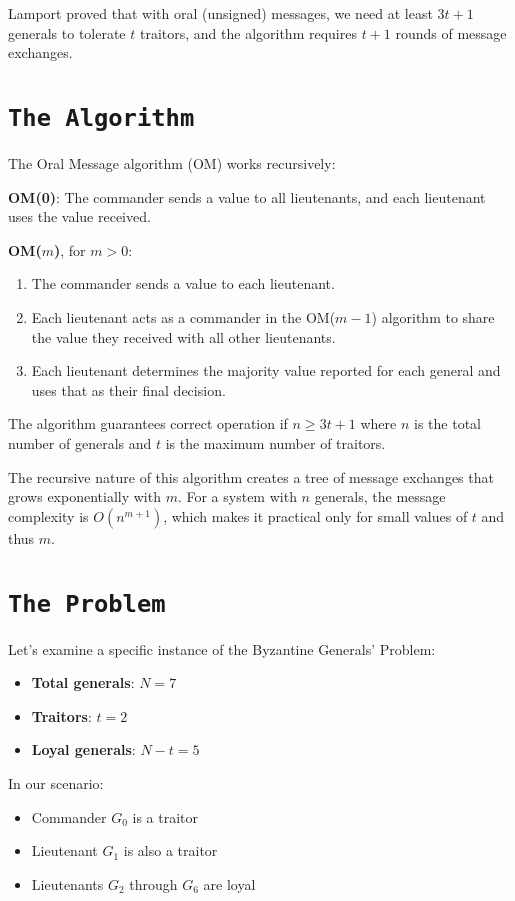 \documentclass[11pt]{article}
\begin{document}
Lamport proved that with oral (unsigned) messages, we need at least $3t+1$ generals to tolerate $t$ traitors, and the algorithm requires $t+1$ rounds of message exchanges.

\section*{\texttt{\Large The Algorithm}}
The Oral Message algorithm (OM) works recursively:

\textbf{OM(0)}: The commander sends a value to all lieutenants, and each lieutenant uses the value received.

\textbf{OM($m$)}, for $m > 0$:
\begin{enumerate}
    \item The commander sends a value to each lieutenant.
    \item Each lieutenant acts as a commander in the OM($m-1$) algorithm to share the value they received with all other lieutenants.
    \item Each lieutenant determines the majority value reported for each general and uses that as their final decision.
\end{enumerate}

The algorithm guarantees correct operation if $n \geq 3t+1$ where $n$ is the total number of generals and $t$ is the maximum number of traitors.

The recursive nature of this algorithm creates a tree of message exchanges that grows exponentially with $m$. For a system with $n$ generals, the message complexity is $O(n^{m+1})$, which makes it practical only for small values of $t$ and thus $m$.

\section*{\texttt{\Large The Problem}}
Let's examine a specific instance of the Byzantine Generals' Problem:

\begin{itemize}
    \item \textbf{Total generals}: $N = 7$
    \item \textbf{Traitors}: $t = 2$
    \item \textbf{Loyal generals}: $N - t = 5$
\end{itemize}

In our scenario:
\begin{itemize}
    \item Commander $G_0$ is a traitor
    \item Lieutenant $G_1$ is also a traitor
    \item Lieutenants $G_2$ through $G_6$ are loyal
\end{itemize}
\end{document}
